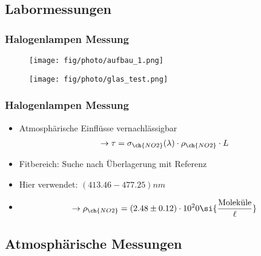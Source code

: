 \documentclass{beamer}
\begin{document}
\begin{frame}
    \section{Labormessungen}
    \frametitle{Halogenlampen Messung}

    \begin{figure}[h]
        \texttt{[image: fig/photo/aufbau\_1.png]}
    \end{figure}

    \begin{figure}[h]
        \texttt{[image: fig/photo/glas\_test.png]}
    \end{figure}
\end{frame}

\begin{frame}
    \frametitle{Halogenlampen Messung}
\begin{itemize}
    \item Atmosphärische Einflüsse vernachlässigbar
        \begin{align}
 \to \tau = \sigma_{\ch{NO2}}(\lambda) \cdot     \rho_{\ch{NO2}} \cdot L
        \end{align}
    \item Fitbereich: Suche nach Überlagerung mit  Referenz
    \item Hier verwendet: $(413.46 - 477.25) \si{nm}$
    \item \begin{align}
            \to \rho_\ch{NO2} = (2.48 \pm 0.12) \cdot 10^20 \si{\frac{\text{Moleküle}}{\ell}}
    \end{align}
\end{itemize}
\end{frame}

\begin{frame}
    \section{Atmosphärische Messungen}
\end{frame}
\end{document}
